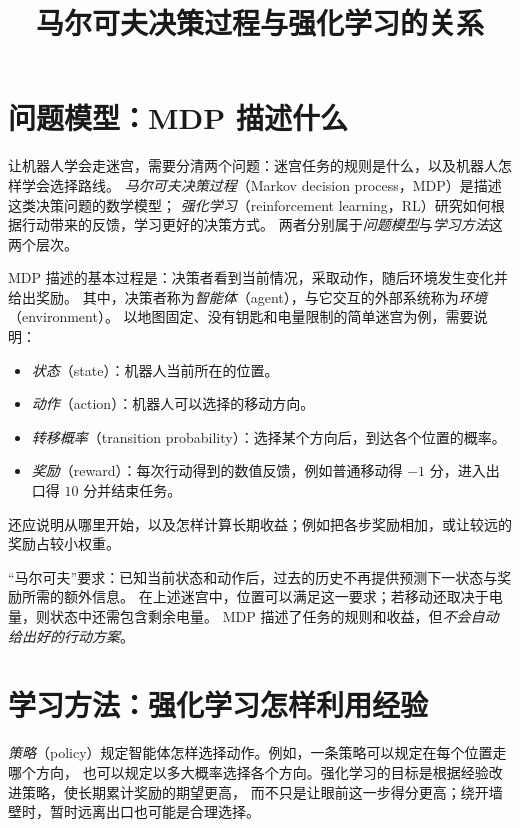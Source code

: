 \documentclass[UTF8,12pt,a4paper,fontset=fandol]{ctexart}
\title{马尔可夫决策过程与强化学习的关系}
\author{}
\date{}
\begin{document}
\maketitle

\section{问题模型：MDP 描述什么}
\label{sec:relation-mdp}

让机器人学会走迷宫，需要分清两个问题：迷宫任务的规则是什么，以及机器人怎样学会选择路线。
\emph{马尔可夫决策过程}（Markov decision process，MDP）是描述这类决策问题的数学模型；
\emph{强化学习}（reinforcement learning，RL）研究如何根据行动带来的反馈，学习更好的决策方式。
两者分别属于\emph{问题模型}与\emph{学习方法}这两个层次。

MDP 描述的基本过程是：决策者看到当前情况，采取动作，随后环境发生变化并给出奖励。
其中，决策者称为\emph{智能体}（agent），与它交互的外部系统称为\emph{环境}（environment）。
以地图固定、没有钥匙和电量限制的简单迷宫为例，需要说明：
\begin{itemize}
  \item \emph{状态}（state）：机器人当前所在的位置。
  \item \emph{动作}（action）：机器人可以选择的移动方向。
  \item \emph{转移概率}（transition probability）：选择某个方向后，到达各个位置的概率。
  \item \emph{奖励}（reward）：每次行动得到的数值反馈，例如普通移动得 $-1$ 分，进入出口得 $10$ 分并结束任务。
\end{itemize}
还应说明从哪里开始，以及怎样计算长期收益；例如把各步奖励相加，或让较远的奖励占较小权重。

“马尔可夫”要求：已知当前状态和动作后，过去的历史不再提供预测下一状态与奖励所需的额外信息。
在上述迷宫中，位置可以满足这一要求；若移动还取决于电量，则状态中还需包含剩余电量。
MDP 描述了任务的规则和收益，但\emph{不会自动给出好的行动方案}。

\section{学习方法：强化学习怎样利用经验}
\label{sec:relation-learning}

\emph{策略}（policy）规定智能体怎样选择动作。例如，一条策略可以规定在每个位置走哪个方向，
也可以规定以多大概率选择各个方向。强化学习的目标是根据经验改进策略，使长期累计奖励的期望更高，
而不只是让眼前这一步得分更高；绕开墙壁时，暂时远离出口也可能是合理选择。
\end{document}

